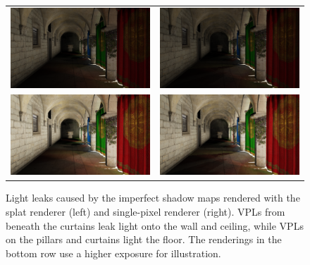 \begin{figure}[htb]
\centering
  \begin{tabular}{@{}cc@{}}
    \includegraphics[width=.48\textwidth]{screenshots/leaks_splat} &
    \includegraphics[width=.48\textwidth]{screenshots/leaks_single_pixel}\\
    \includegraphics[width=.48\textwidth]{screenshots/leaks_splat_exposure} &
    \includegraphics[width=.48\textwidth]{screenshots/leaks_single_pixel_exposure}
  \end{tabular}
  \caption{Light leaks caused by the imperfect shadow maps rendered with the splat renderer (left) and single-pixel renderer (right). VPLs from beneath the curtains leak light onto the wall and ceiling, while VPLs on the pillars and curtains light the floor. The renderings in the bottom row use a higher exposure for illustration. }
  \label{fig:results:leaks}
\end{figure}


